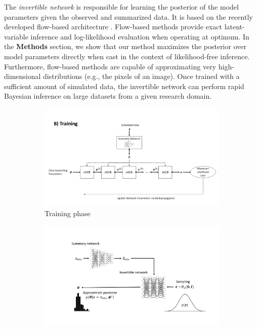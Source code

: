 \documentclass[9pt,twoside,lineno]{pnas-new}
\begin{document}
The \textit{invertible network} is responsible for learning the posterior of the model parameters given the observed and summarized data. It is based on the recently developed flow-based architecture \cite{kingma2018glow, grover2018flow, dinh2016density}. Flow-based methods provide exact latent-variable inference and log-likelihood evaluation when operating at optimum. In the \textbf{Methods} section, we show that our method maximizes the posterior over model parameters directly when cast in the context of likelihood-free inference. Furthermore, flow-based methods are capable of approximating very high-dimensional distributions (e.g., the pixels of an image). Once trained with a sufficient amount of simulated data, the invertible network can perform rapid Bayesian inference on large datasets from a given research domain. 
\begin{figure}
  \begin{subfigure}[b]{0.49\textwidth}
    \includegraphics[width=\textwidth]{training.png}
    \caption{Training phase}
    \label{fig:Fig.1a}
  \end{subfigure}
  \begin{subfigure}[b]{0.49\textwidth}
    \includegraphics[width=\textwidth]{inference.png}

\end{subfigure}
\end{figure}
\end{document}
